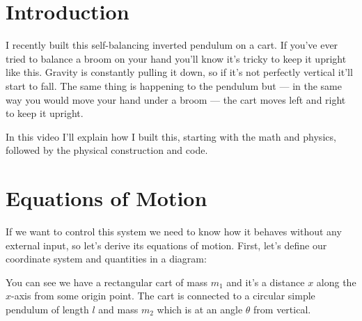 \documentclass{article}
\begin{document}
\tableofcontents

\section{Introduction}

I recently built this self-balancing inverted pendulum on a cart. If you’ve ever tried to balance a broom on your hand you’ll know it’s tricky to keep it upright like this. Gravity is constantly pulling it down, so if it’s not perfectly vertical it’ll start to fall. The same thing is happening to the pendulum but — in the same way you would move your hand under a broom — the cart moves left and right to keep it upright.

In this video I’ll explain how I built this, starting with the math and physics, followed by the physical construction and code.

\section{Equations of Motion}

If we want to control this system we need to know how it behaves without any external input, so let’s derive its equations of motion. First, let's define our coordinate system and quantities in a diagram:

\begin{figure}[h]
  \centering
\end{figure}

You can see we have a rectangular cart of mass $m_1$ and it's a distance $x$ along the $x$-axis from some origin point. The cart is connected to a circular simple pendulum of length $l$ and mass $m_2$ which is at an angle $\theta$ from vertical.
\end{document}
